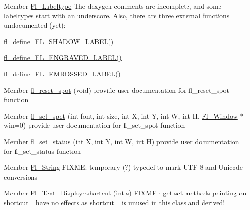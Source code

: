 \begin{DoxyRefList}
\item[Member \mbox{\hyperlink{_enumerations_8_h_ad5774781d33328b82990ff9e25dfd61b}{Fl\+\_\+\+Labeltype}} ]\label{todo__todo000004}%
%
The doxygen comments are incomplete, and some labeltypes start with an underscore. Also, there are three external functions undocumented (yet)\+:
\begin{DoxyItemize}
\item \mbox{\hyperlink{_enumerations_8_h_acceca4e5fa60fae68ee0098bd9f44124}{fl\+\_\+define\+\_\+\+F\+L\+\_\+\+S\+H\+A\+D\+O\+W\+\_\+\+L\+A\+B\+E\+L()}}
\item \mbox{\hyperlink{_enumerations_8_h_ad2356471e464dcdc818929365be0781e}{fl\+\_\+define\+\_\+\+F\+L\+\_\+\+E\+N\+G\+R\+A\+V\+E\+D\+\_\+\+L\+A\+B\+E\+L()}}
\item \mbox{\hyperlink{_enumerations_8_h_a323a068ca36b789472bfb8e50e155b93}{fl\+\_\+define\+\_\+\+F\+L\+\_\+\+E\+M\+B\+O\+S\+S\+E\+D\+\_\+\+L\+A\+B\+E\+L()}}  
\end{DoxyItemize}
\item[Member \mbox{\hyperlink{group__fl__drawings_gaa6c8068dbc30f05765330e31f08350d7}{fl\+\_\+reset\+\_\+spot}} (void)]\label{todo__todo000015}%
%
provide user documentation for fl\+\_\+reset\+\_\+spot function  
\item[Member \mbox{\hyperlink{group__fl__drawings_ga748fcead12c8cc67cb517cab02c273a2}{fl\+\_\+set\+\_\+spot}} (int font, int size, int X, int Y, int W, int H, \mbox{\hyperlink{class_fl___window}{Fl\+\_\+\+Window}} $\ast$win=0)]\label{todo__todo000014}%
%
provide user documentation for fl\+\_\+set\+\_\+spot function  
\item[Member \mbox{\hyperlink{group__fl__drawings_ga496c7d22ad30fe84717bb765dd6d1fc8}{fl\+\_\+set\+\_\+status}} (int X, int Y, int W, int H)]\label{todo__todo000013}%
%
provide user documentation for fl\+\_\+set\+\_\+status function  
\item[Member \mbox{\hyperlink{fl__types_8h_af1e24dee50aaad72d85c462eefbc2f68}{Fl\+\_\+\+String}} ]\label{todo__todo000019}%
%
F\+I\+X\+ME\+: temporary (?) typedef to mark U\+T\+F-\/8 and Unicode conversions  
\item[Member \mbox{\hyperlink{class_fl___text___display_a3ec453b6dc9cc468619688c5bdf3dc95}{Fl\+\_\+\+Text\+\_\+\+Display::shortcut}} (int s)]\label{todo__todo000018}%
%
F\+I\+X\+ME \+: get set methods pointing on shortcut\+\_\+ have no effects as shortcut\+\_\+ is unused in this class and derived!  

\end{DoxyRefList}
